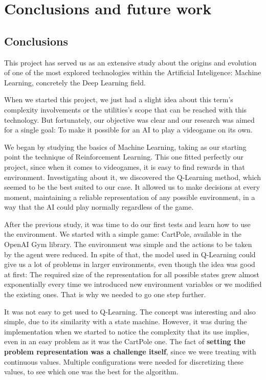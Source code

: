 \chapter{Conclusions and future work}
\label{cap:conclusions}


\section{Conclusions}

This project has served us as an extensive study about the origins and evolution of one of the most explored technologies within the Artificial Inteligence: Machine Learning, concretely the Deep Learning field.

When we started this project, we just had a slight idea about this term's complexity involvements or the utilities's scope that can be reached with this technology. But fortunately, our objective was clear and our research was aimed for a single goal: To make it possible for an AI to play a videogame on its own.

We began by studying the basics of Machine Learning, taking as our starting point the technique of Reinforcement Learning. This one fitted perfectly our project, since when it comes to videogames, it is easy to find rewards in that environment. Investigating about it, we discovered the Q-Learning method, which seemed to be the best suited to our case. It allowed us to make decisions at every moment, maintaining a reliable representation of any possible environment, in a way that the AI could play normally regardless of the game.

After the previous study, it was time to do our first tests and learn how to use the environment. We started with a simple game: CartPole, available in the OpenAI Gym library. The environment was simple and the actions to be taken by the agent were reduced. In spite of that, the model used in Q-Learning could give us a lot of problems in larger environments, even though the idea was good at first: The required size of the representation for all possible states grew almost exponentially every time we introduced new environment variables or we modified the existing ones. That is why we needed to go one step further. 

It was not easy to get used to Q-Learning. The concept was interesting and also simple, due to its similarity with a state machine. However, it was during the implementation when we started to notice the complexity that its use implies, even in an easy problem as it was the CartPole one. The fact of \textbf{setting the problem representation was a challenge itself}, since we were treating with continuous values. Multiple configurations were needed for discretizing these values, to see which one was the best for the algorithm.

